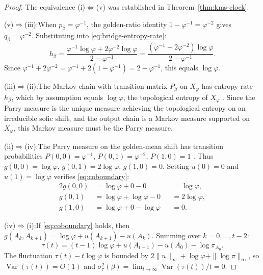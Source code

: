 \begin{proof}
The equivalence (i)$\Leftrightarrow$(v) was established in Theorem~\ref{thm:kms-clock}.

(v)$\Rightarrow$(iii):\enspace When $p_\beta=\varphi^{-1}$, the golden-ratio identity $1-\varphi^{-1}=\varphi^{-2}$ gives $q_\beta=\varphi^{-2}$. Substituting into \eqref{eq:bridge-entropy-rate}:
\[
h_\beta
=
\frac{\varphi^{-1}\log\varphi+2\varphi^{-2}\log\varphi}{2-\varphi^{-1}}
=
\frac{(\varphi^{-1}+2\varphi^{-2})\log\varphi}{2-\varphi^{-1}}.
\]
Since $\varphi^{-1}+2\varphi^{-2}=\varphi^{-1}+2(1-\varphi^{-1})=2-\varphi^{-1}$, this equals $\log\varphi$.

(iii)$\Rightarrow$(ii):\enspace The Markov chain with transition matrix $P_\beta$ on $X_\varphi$ has entropy rate $h_\beta$, which by assumption equals $\log\varphi$, the topological entropy of $X_\varphi$ \cite{LindMarcus1995}. Since the Parry measure is the unique measure achieving the topological entropy on an irreducible sofic shift, and the output chain is a Markov measure supported on $X_\varphi$, this Markov measure must be the Parry measure.

(ii)$\Rightarrow$(iv):\enspace The Parry measure on the golden-mean shift has transition probabilities $P(0,0)=\varphi^{-1}$, $P(0,1)=\varphi^{-2}$, $P(1,0)=1$ \cite{LindMarcus1995}. Thus $g(0,0)=\log\varphi$, $g(0,1)=2\log\varphi$, $g(1,0)=0$. Setting $u(0)=0$ and $u(1)=\log\varphi$ verifies \eqref{eq:coboundary}:
\begin{alignat*}{2}
g(0,0)&=\log\varphi+0-0&&=\log\varphi,\\
g(0,1)&=\log\varphi+\log\varphi-0&&=2\log\varphi,\\
g(1,0)&=\log\varphi+0-\log\varphi&&=0.
\end{alignat*}

(iv)$\Rightarrow$(i):\enspace If \eqref{eq:coboundary} holds, then $g(A_k,A_{k+1})=\log\varphi+u(A_{k+1})-u(A_k)$. Summing over $k=0,\dots,t-2$:
\[
\tau(t)=(t-1)\log\varphi+u(A_{t-1})-u(A_0)-\log\pi_{A_0}.
\]
The fluctuation $\tau(t)-t\log\varphi$ is bounded by $2\|u\|_\infty+\log\varphi+\|\log\pi\|_\infty$, so $\operatorname{Var}(\tau(t))=O(1)$ and $\sigma_\tau^2(\beta)=\lim_{t\to\infty}\operatorname{Var}(\tau(t))/t=0$.


\end{proof}
